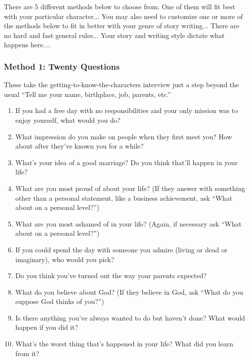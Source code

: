 \documentclass[openleft,oneside,showtrims]{memoir}
\begin{document}
There are 5 different methods below to choose from.  One of them will fit best with your particular character... You may also need to customize one or more of the methods below to fit in better with your genre of story writing... There are no hard and fast general rules...  Your story and writing style dictate what happens here....

\subsubsection*{Method 1:  Twenty Questions}
\label{sec:org87d02dd}
These take the getting-to-know-the-characters interview just a step beyond the usual ``Tell me your name, birthplace, job, parents, etc.''

\begin{enumerate}
\item If you had a free day with no responsibilities and your only mission was to enjoy yourself, what would you do?

\item What impression do you make on people when they first meet you? How about after they've known you for a while?

\item What's your idea of a good marriage? Do you think that'll happen in your life?

\item What are you most proud of about your life? (If they answer with something other than a personal statement, like a business achievement, ask ``What about on a personal level?'')

\item What are you most ashamed of in your life? (Again, if necessary ask ``What about on a personal level?'')

\item If you could spend the day with someone you admire (living or dead or imaginary), who would you pick?

\item Do you think you've turned out the way your parents expected?

\item What do you believe about God? (If they believe in God, ask ``What do you suppose God thinks of you?'')

\item Is there anything you've always wanted to do but haven't done? What would happen if you did it?

\item What's the worst thing that's happened in your life? What did you learn from it?


\end{enumerate}
\end{document}
